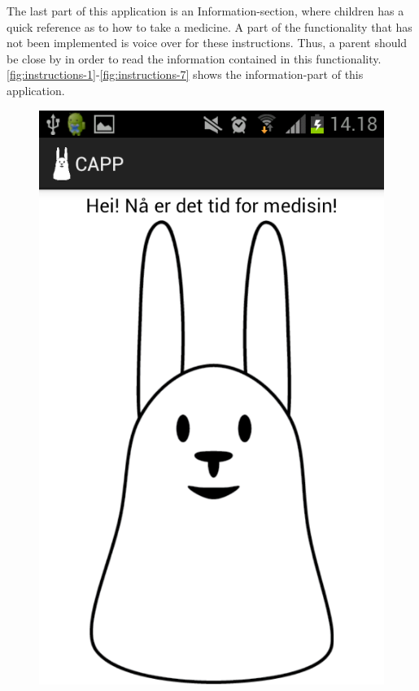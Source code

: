The last part of this application is an Information-section, where children has a quick reference as to how to take a medicine. A part of the functionality that has not been implemented is voice over for these instructions. Thus, a parent should be close by in order to read the information contained in this functionality.     
\ref{fig:instructions-1}-\ref{fig:instructions-7} shows the information-part of this application.



\begin{figure}[H]
	\begin{minipage}[b]{0.3\linewidth}
		\centering
			\includegraphics[width=0.20\paperwidth]{Pictures/app-screenshots/capp_start_treatment.png}

\end{minipage}
\end{figure}
